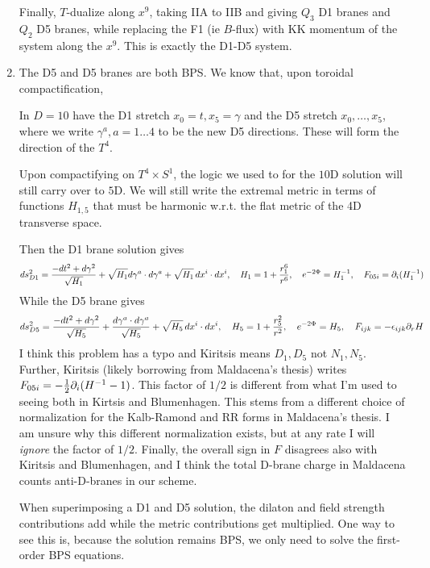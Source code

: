 \documentclass[11pt, class=article, crop=false]{standalone}
\begin{document}
\begin{enumerate}
	Finally, $T$-dualize along $x^9$, taking IIA to IIB and giving $Q_3$ D1 branes and $Q_2$ D5 branes, while replacing the F1 (ie $B$-flux) with KK momentum of the system along the $x^9$. This is exactly the D1-D5 system.
	
	\item The D5 and D5 branes are both BPS. We know that, upon toroidal compactification, 
	
	In $D=10$ have the D1 stretch $x_0 = t, x_5 = \gamma$ and the D5 stretch $x_0, \dots, x_5$, where we write $\gamma^a, a=1 \dots 4$ to be the new D5 directions. These will form the direction of the $T^4$.
	
	Upon compactifying on $T^4 \times S^1$, the logic we used to for the $10$D solution will still carry over to $5$D. We will still write the extremal metric in terms of functions $H_{1,5}$ that must be harmonic w.r.t. the flat metric of the 4D transverse space.
	
	Then the D1 brane solution gives
	\[
		ds^2_{D1}= \frac{-dt^2 + d\gamma^2}{\sqrt{H_1}} + \sqrt{H_1} d \gamma^a \cdot d \gamma^a + \sqrt{H_1}\, dx^i \cdot dx^i, \quad H_1 = 1 + \frac{r_1^6}{r^6}, \quad e^{-2\Phi} = H_1^{-1}, \quad F_{05i} = \partial_i (H_1^{-1})
	\]
	While the D5 brane gives
	\[
		ds^2_{D5} = \frac{-dt^2 + d\gamma^2}{\sqrt{H_5}} + \frac{d \gamma^a \cdot d \gamma^a}{\sqrt{H_5}} + \sqrt{H_5} \, dx^i \cdot dx^i, \quad H_5 = 1 + \frac{r_5^2}{r^2}, \quad e^{-2\Phi} = H_5, \quad F_{ijk} = -\epsilon_{ijk} \partial_r H
	\]
	I think this problem has a typo and Kiritsis means $D_1, D_5$ not $N_1, N_5$. Further, Kiritsis (likely borrowing from Maldacena's thesis) writes $F_{05i} = -\frac12 \partial_i (H^{-1} - 1)$. This factor of $1/2$ is different from what I'm used to seeing both in Kirtsis and Blumenhagen. This stems from a different choice of normalization for the Kalb-Ramond and RR forms in Maldacena's thesis. I am unsure why this different normalization exists, but at any rate I will \emph{ignore} the factor of $1/2$. Finally, the overall sign in $F$ disagrees also with Kiritsis and Blumenhagen, and I think the total D-brane charge in Maldacena counts anti-D-branes in our scheme.
	
	When superimposing a D1 and D5 solution, the dilaton and field strength contributions add while the metric contributions get multiplied. One way to see this is, because the solution remains BPS, we only need to solve the first-order BPS equations.
	

\end{enumerate}
\end{document}
